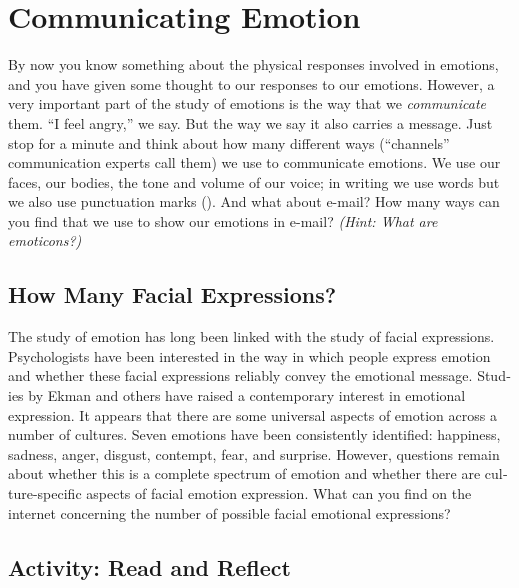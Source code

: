 \documentclass[
]{book}
\begin{document}
\hypertarget{communicating-emotion}{%
\section{Communicating Emotion}\label{communicating-emotion}}

By now you know something about the physical responses involved in emotions, and you have given some thought to our responses to our emotions. However, a very important part of the study of emotions is the way that we \emph{communicate} them. ``I feel angry,'' we say. But the way we say it also carries a message. Just stop for a minute and think about how many different ways (``channels'' communication experts call them) we use to communicate emotions. We use our faces, our bodies, the tone and volume of our voice; in writing we use words but we also use punctuation marks (). And what about e-mail? How many ways can you find that we use to show our emotions in e-mail? \emph{(Hint: What are emoticons?)}

\hypertarget{how-many-facial-expressions}{%
\subsection*{How Many Facial Expressions?}\label{how-many-facial-expressions}}

The study of emotion has long been linked with the study of facial expressions. Psychologists have been interested in the way in which people express emotion and whether these facial expressions reliably convey the emotional message. Stud­ies by Ekman and others have raised a contemporary interest in emotional expression. It appears that there are some universal aspects of emotion across a number of cul­tures. Seven emotions have been consistently identified: happi­ness, sadness, anger, disgust, contempt, fear, and surprise. However, questions remain about whether this is a complete spectrum of emotion and whether there are cul­ture-specific aspects of facial emotion expression. What can you find on the internet concerning the number of possible facial emotional expressions?

\hypertarget{activity-read-and-reflect-12}{%
\subsection*{Activity: Read and Reflect}\label{activity-read-and-reflect-12}}
\end{document}
